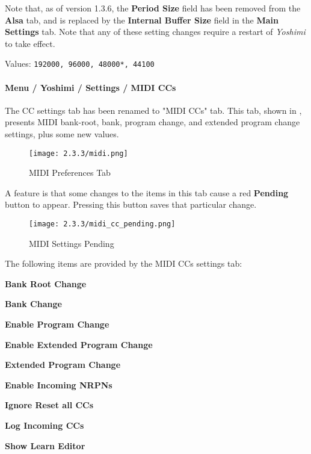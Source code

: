    Note that, as of version 1.3.6, the \textbf{Period Size} field has been
   removed from the \textbf{Alsa} tab, and is replaced by the
   \textbf{Internal Buffer Size} field in the \textbf{Main Settings} tab.
   Note that any of these setting changes require a restart of \textsl{Yoshimi}
   to take effect.

   Values: \texttt{192000, 96000, 48000*, 44100}

\paragraph{Menu / Yoshimi / Settings / MIDI CCs}
\label{paragraph:menu_yoshimi_settings_ccs}

   The CC settings tab has been renamed to "MIDI CCs" tab.
   This tab, shown in
   ,
   presents MIDI bank-root, bank, program change, and extended program
   change settings, plus some new values.

\begin{figure}[H]
   \centering
   \texttt{[image: 2.3.3/midi.png]}
   \caption[MIDI Preferences]{MIDI Preferences Tab}
   \label{fig:yoshimi_settings_cc}
\end{figure}

   A feature is that some changes to the items in this tab cause a
   red \textbf{Pending} button to appear.  Pressing this button saves
   that particular change.

\begin{figure}[H]
   \centering
   \texttt{[image: 2.3.3/midi\_cc\_pending.png]}
   \caption[MIDI Settings Pending]{MIDI Settings Pending}
   \label{fig:yoshimi_settings_pending}
\end{figure}

   The following items are provided by the MIDI CCs settings tab:

   \begin{enumber}
      \item \textbf{Bank Root Change}
      \item \textbf{Bank Change}
      \item \textbf{Enable Program Change}
      \item \textbf{Enable Extended Program Change}
      \item \textbf{Extended Program Change}
      \item \textbf{Enable Incoming NRPNs}
      \item \textbf{Ignore Reset all CCs}
      \item \textbf{Log Incoming CCs}
      \item \textbf{Show Learn Editor}
   \end{enumber}

